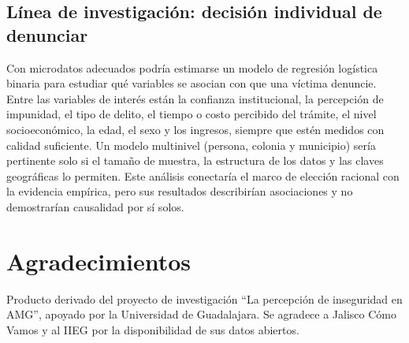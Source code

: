\documentclass[10pt,twocolumn,letterpaper]{article}
\begin{document}
\subsection{Línea de investigación: decisión individual de denunciar}

Con microdatos adecuados podría estimarse un modelo de regresión
logística binaria para estudiar qué variables se asocian con que una
víctima denuncie. Entre las variables de interés están la confianza
institucional, la percepción de impunidad, el tipo de delito, el tiempo
o costo percibido del trámite, el nivel socioeconómico, la edad, el sexo
y los ingresos, siempre que estén medidos con calidad suficiente. Un
modelo multinivel (persona, colonia y municipio) sería pertinente solo
si el tamaño de muestra, la estructura de los datos y las claves
geográficas lo permiten. Este análisis conectaría el marco de elección
racional con la evidencia empírica, pero sus resultados describirían
asociaciones y no demostrarían causalidad por sí solos.

\section*{Agradecimientos}

Producto derivado del proyecto de investigación ``La percepción de
inseguridad en AMG'', apoyado por la Universidad de Guadalajara. Se
agradece a Jalisco Cómo Vamos y al IIEG por la disponibilidad de sus
datos abiertos.
\end{document}
